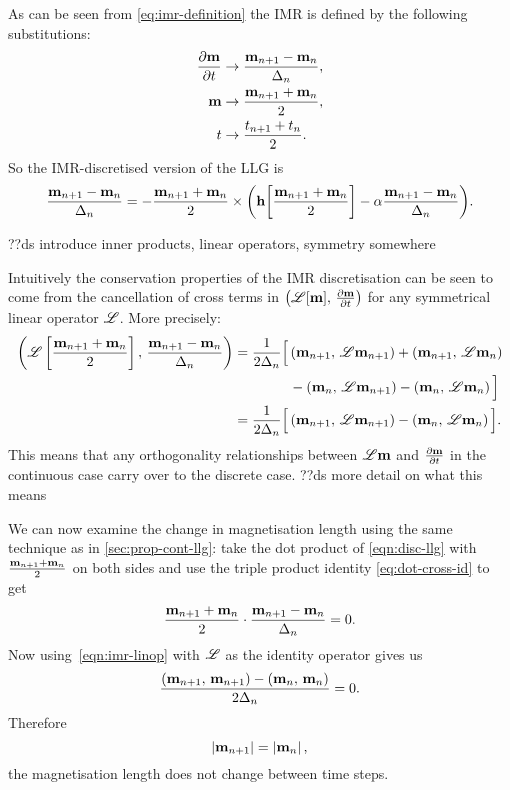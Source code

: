 As can be seen from \cref{eq:imr-definition} the IMR is defined by the following substitutions:
\begin{equation}
\begin{aligned}
  \label{eq:55}
  \frac{\partial \mathbf{m}}{\partial t} &\rightarrow \frac{\mathbf{m}_{n+1} - \mathbf{m}_n}{\Delta_{n}}, \\
  \mathbf{m} &\rightarrow \frac{\mathbf{m}_{n+1} + \mathbf{m}_n}{2}, \\
  t &\rightarrow \frac{t_{n+1} + t_n}{2}.
\end{aligned}
\end{equation}
So the IMR-discretised version of the LLG is
\begin{equation}
  \frac{\mathbf{m}_{n+1} - \mathbf{m}_n}{\Delta_{n}} = - \frac{\mathbf{m}_{n+1} + \mathbf{m}_n}{2} \times
  {\left( \mathbf{h}{\left[ \frac{\mathbf{m}_{n+1} + \mathbf{m}_n}{2} \right]} - \alpha\frac{\mathbf{m}_{n+1} - \mathbf{m}_n}{\Delta_{n}} \right)}.
  \label{eqn:disc-llg}
\end{equation}

??ds introduce inner products, linear operators, symmetry somewhere

Intuitively the conservation properties of the IMR discretisation can be seen to come from the cancellation of cross terms in $\left(\mathscr{L}[\mathbf{m}],\, \frac{\partial \mathbf{m}}{\partial t} \right)$ for any symmetrical linear operator $\mathscr{L}$.
More precisely:
\begin{equation}
  \begin{aligned}
    \label{eqn:imr-linop}
    \left(\mathscr{L} \left[ \frac{\mathbf{m}_{n+1} + \mathbf{m}_n}{2} \right],\,  \frac{\mathbf{m}_{n+1} - \mathbf{m}_n}{\Delta_{n}}  \right)
    &= \frac{1}{2\Delta_{n}} \Big[
    \left(\mathbf{m}_{n+1},\, \mathscr{L} \mathbf{m}_{n+1} \right) + \left(\mathbf{m}_{n+1},\, \mathscr{L} \mathbf{m}_{n} \right) \\
    & \qquad\qquad - \left(\mathbf{m}_{n},\, \mathscr{L} \mathbf{m}_{n+1} \right) - \left(\mathbf{m}_{n},\, \mathscr{L} \mathbf{m}_{n} \right)
    \Big] \\
    &= \frac{1}{2\Delta_{n}} \Big[
    \left(\mathbf{m}_{n+1},\, \mathscr{L} \mathbf{m}_{n+1} \right)
    - \left(\mathbf{m}_{n},\, \mathscr{L} \mathbf{m}_{n} \right)
    \Big].
  \end{aligned}
\end{equation}
This means that any orthogonality relationships between $\mathscr{L} \mathbf{m}$ and $\frac{\partial \mathbf{m}}{\partial t}$ in the continuous case carry over to the discrete case. ??ds more detail on what this means

We can now examine the change in magnetisation length using the same technique as in \cref{sec:prop-cont-llg}: take the dot product of \cref{eqn:disc-llg} with $\frac{\mathbf{m}_{n+1} + \mathbf{m}_n}{2}$ on both sides and use the triple product identity \cref{eq:dot-cross-id} to get
\begin{equation}
  \label{eq:63}
  \frac{\mathbf{m}_{n+1} + \mathbf{m}_n}{2} \cdot \frac{\mathbf{m}_{n+1} - \mathbf{m}_n}{\Delta_{n}} = 0.
\end{equation}
Now using~\cref{eqn:imr-linop} with $\mathscr{L}$ as the identity operator gives us
\begin{equation}
  \frac{\left(\mathbf{m}_{n+1},\, \mathbf{m}_{n+1} \right) - \left(\mathbf{m}_n,\, \mathbf{m}_n \right) }{2 \Delta_{n}} = 0.
\end{equation}
Therefore
\begin{equation}
  \left|{\mathbf{m}_{n+1}} \right| = \left|{\mathbf{m}_n} \right|,
\end{equation}
\ie the magnetisation length does not change between time steps.

